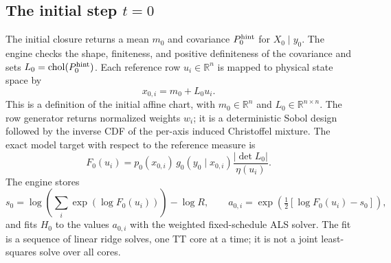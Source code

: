 \documentclass[11pt]{article}
\begin{document}
\subsection{The initial step $t=0$}

The initial closure returns a mean $m_0$ and covariance $P_0^{\rm hint}$ for
$X_0\mid y_0$.  The engine checks the shape, finiteness, and positive
definiteness of the covariance and sets
$L_0=\operatorname{chol}(P_0^{\rm hint})$.  Each reference row
$u_i\in\mathbb R^n$ is mapped to physical state space by
\begin{equation}
  x_{0,i}=m_0+L_0u_i.
  \label{eq:actual-initial-map}
\end{equation}
This is a definition of the initial affine chart, with
$m_0\in\mathbb R^n$ and $L_0\in\mathbb R^{n\times n}$.
The row generator returns normalized weights $w_i$; it is a deterministic
Sobol design followed by the inverse CDF of the per-axis induced Christoffel
mixture.  The exact model target with respect to the reference measure is
\begin{equation}
  F_0(u_i)=
  p_0(x_{0,i})\,g_0(y_0\mid x_{0,i})
  \frac{|\det L_0|}{\eta(u_i)}.
  \label{eq:actual-initial-target}
\end{equation}
The engine stores
\begin{equation}
  s_0=\log\!\left(\sum_i\exp(\log F_0(u_i))\right)-\log R,
  \qquad
  a_{0,i}=\exp\!\left(\tfrac12[\log F_0(u_i)-s_0]\right),
  \label{eq:actual-initial-scale}
\end{equation}
and fits $H_0$ to the values $a_{0,i}$ with the weighted fixed-schedule ALS
solver.  The fit is a sequence of linear ridge solves, one TT core at a time;
it is not a joint least-squares solve over all cores.
\end{document}
